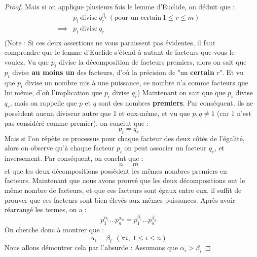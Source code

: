 \begin{proof}
Mais si on applique plusieurs fois le lemme d'Euclide, on déduit que :
\begin{align*}
    & p_i \ \text{divise} \ q_r^{\beta_r} \ (\text{pour un certain} \ 1 \leq r \leq m) \\
    \implies & p_i \ \text{divise} \ q_r \\
\end{align*}
(Note : Si ces deux assertions ne vous paraissent pas évidentes, il faut comprendre que le lemme d'Euclide s'étend à autant de facteurs que vous le voulez. Vu que $p_i$ divise la décomposition de facteurs premiers, alors on sait que $p_i$ divise \textbf{au moins un} des facteurs, d'où la précision de "un \textbf{certain} $r$". \newline
Et vu que $p_i$ divise un nombre mis à une puissance, ce nombre n'a comme facteurs que lui même, d'où l'implication que $p_i$ divise $q_r$) \newline
\newline
Maintenant on sait que que $p_i$ divise $q_r$, mais on rappelle que $p$ et $q$ sont des nombres \textbf{premiers}.\newline
Par conséquent, ils ne possèdent aucun diviseur autre que 1 et eux-même, et vu que $p,q \not= 1$ (car $1$ n'est pas considéré comme premier), on conclut que :
$$p_i=q_r$$
Mais si l'on répète ce processus pour chaque facteur des deux côtés de l'égalité, alors on observe qu'à chaque facteur $p_i$ on peut associer un facteur $q_r$, et inversement. \newline
Par conséquent, on conclut que :
$$n=m$$
et que les deux décompositions possèdent les mêmes nombres premiers en facteurs. \newline
\newline
Maintenant que nous avons prouvé que les deux décompositions ont le même nombre de facteurs, et que ces facteurs sont égaux entre eux, il suffit de prouver que ces facteurs sont bien élevés aux mêmes puissances. \newline
Après avoir réarrangé les termes, on a :
\begin{equation} \label{equ:Facteurs}
    p_1^{\alpha_1} \ldots p_n^{\alpha_n} = p_1^{\beta_1} \ldots p_n^{\beta_n}
\end{equation}
On cherche donc à montrer que :
$$\alpha_i = \beta_i \ \ (\forall i, \ 1 \leq i \leq n)$$
\newline
Nous allons démontrer cela par l'absurde : \newline
Assumons que $\alpha_i > \beta_i$ \newline

\end{proof}
